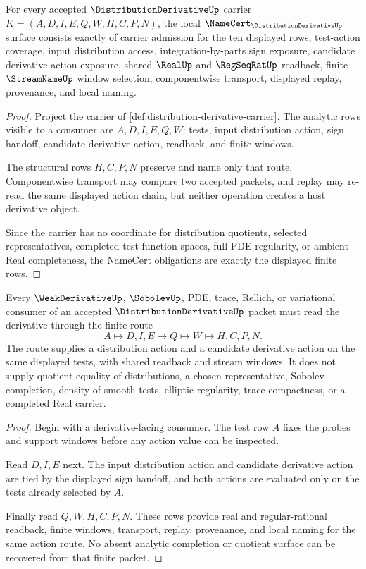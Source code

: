 \begin{theorem}
\label{thm:distribution-derivative-namecert-obligations}
For every accepted $\DistributionDerivativeUp$ carrier $K=(A,D,I,E,Q,W,H,C,P,N)$, the local $\NameCert_{\DistributionDerivativeUp}$ surface consists exactly of carrier admission for the ten displayed rows, test-action coverage, input distribution access, integration-by-parts sign exposure, candidate derivative action exposure, shared $\RealUp$ and $\RegSeqRatUp$ readback, finite $\StreamNameUp$ window selection, componentwise transport, displayed replay, provenance, and local naming.
\end{theorem}
\begin{proof}
Project the carrier of \autoref{def:distribution-derivative-carrier}. The analytic rows visible to a consumer are $A,D,I,E,Q,W$: tests, input distribution action, sign handoff, candidate derivative action, readback, and finite windows.

The structural rows $H,C,P,N$ preserve and name only that route. Componentwise transport may compare two accepted packets, and replay may re-read the same displayed action chain, but neither operation creates a host derivative object.

Since the carrier has no coordinate for distribution quotients, selected representatives, completed test-function spaces, full PDE regularity, or ambient Real completeness, the NameCert obligations are exactly the displayed finite rows.
\end{proof}

\begin{theorem}
\label{thm:distribution-derivative-weak-action-route}
Every $\WeakDerivativeUp$, $\SobolevUp$, PDE, trace, Rellich, or variational consumer of an accepted $\DistributionDerivativeUp$ packet must read the derivative through the finite route
$$
A\longmapsto D,I,E\longmapsto Q\longmapsto W\longmapsto H,C,P,N.
$$
The route supplies a distribution action and a candidate derivative action on the same displayed tests, with shared readback and stream windows. It does not supply quotient equality of distributions, a chosen representative, Sobolev completion, density of smooth tests, elliptic regularity, trace compactness, or a completed Real carrier.
\end{theorem}
\begin{proof}
Begin with a derivative-facing consumer. The test row $A$ fixes the probes and support windows before any action value can be inspected.

Read $D,I,E$ next. The input distribution action and candidate derivative action are tied by the displayed sign handoff, and both actions are evaluated only on the tests already selected by $A$.

Finally read $Q,W,H,C,P,N$. These rows provide real and regular-rational readback, finite windows, transport, replay, provenance, and local naming for the same action route. No absent analytic completion or quotient surface can be recovered from that finite packet.
\end{proof}

